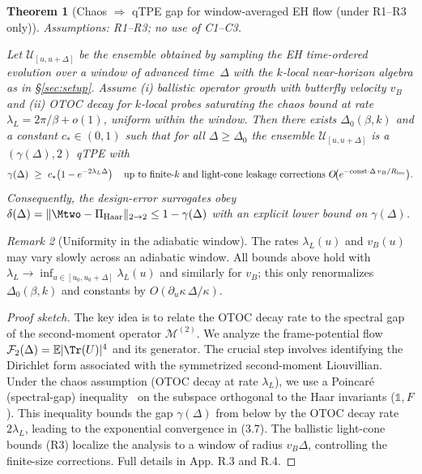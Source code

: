 \documentclass[aps,prd,preprint,onecolumn,superscriptaddress,nofootinbib,longbibliography,floatfix,11pt,showpacs,showkeys]{revtex4-2}
\theoremstyle{plain}
\newtheorem{theorem}{Theorem}
\theoremstyle{definition}
\theoremstyle{remark}
\newtheorem{remark}[theorem]{Remark}
\begin{document}
\begin{theorem}[Chaos $\Rightarrow$ qTPE gap for window-averaged EH flow (under R1--R3 only)]\label{thm:chaos-to-gap}
\emph{Assumptions:} R1--R3; no use of C1--C3.

Let $\mathcal{U}_{[u,u+\Delta]}$ be the ensemble obtained by sampling the EH time-ordered evolution over a window of advanced time~$\Delta$ with the $k$-local near-horizon algebra as in \S\ref{sec:setup}. Assume (i) ballistic operator growth with butterfly velocity $v_B$ and (ii) OTOC decay for $k$-local probes saturating the chaos bound at rate $\lambda_L=2\pi/\beta+o(1)$, uniform within the window. Then there exists $\Delta_0(\beta,k)$ and a constant $c_* \in (0,1)$ such that for all $\Delta\ge \Delta_0$ the ensemble $\mathcal{U}_{[u,u+\Delta]}$ is a $(\gamma(\Delta),2)$ qTPE with
\begin{equation}\label{eq:gamma-lower}
\gamma(\Delta)\ \ge\ c_*\!\left(1-e^{-2\lambda_L\Delta}\right) 
\quad\text{up to finite-$k$ and light-cone leakage corrections } 
O\!\big(e^{-\mathrm{const}\cdot \Delta\, v_B/R_{\rm loc}}\big).
\end{equation}
Consequently, the design-error surrogates obey $\delta(\Delta)=\|\Mtwo-\Pi_{\rm Haar}\|_{2\to 2}\le 1-\gamma(\Delta)$ with an explicit lower bound on $\gamma(\Delta)$.
\end{theorem}
\begin{remark}[Uniformity in the adiabatic window]\label{rem:uniformity-window}
The rates $\lambda_L(u)$ and $v_B(u)$ may vary slowly across an adiabatic window. All bounds above hold with $\lambda_L\to\inf_{u\in[u_0,u_0+\Delta]}\lambda_L(u)$ and similarly for $v_B$; this only renormalizes $\Delta_0(\beta,k)$ and constants by $O(\partial_u \kappa\,\Delta/\kappa)$.
\end{remark}
\begin{proof}[Proof sketch]
The key idea is to relate the OTOC decay rate to the spectral gap of the second-moment operator $\mathcal{M}^{(2)}$. We analyze the frame-potential flow $\mathcal{F}_2(\Delta)=\mathbb{E}|\Tr(U)|^{4}$ and its generator. The crucial step involves identifying the Dirichlet form associated with the symmetrized second-moment Liouvillian. Under the chaos assumption (OTOC decay at rate $\lambda_L$), we use a Poincaré (spectral-gap) inequality~\cite{RobertsYoshida:2017} on the subspace orthogonal to the Haar invariants ($\mathbb{1}, F$). This inequality bounds the gap $\gamma(\Delta)$ from below by the OTOC decay rate $2\lambda_L$, leading to the exponential convergence in (3.7). The ballistic light-cone bounds (R3) localize the analysis to a window of radius $v_B\Delta$, controlling the finite-size corrections.
Full details in App. R.3 and R.4.
\end{proof}
\end{document}
